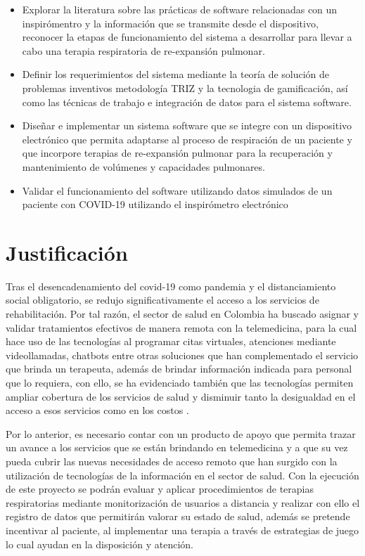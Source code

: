 \begin{itemize}
\item Explorar la literatura sobre las pr\'acticas de software relacionadas con un inspir\'omentro y la informaci\'on que se transmite desde el dispositivo, reconocer la etapas de funcionamiento del sistema a desarrollar para llevar a cabo una terapia respiratoria de  re-expansi\'on pulmonar.

\item Definir los requerimientos del sistema mediante la teor\'ia de soluci\'on de problemas inventivos metodolog\'ia TRIZ y la tecnologia de gamificaci\'on, as\'i como las t\'ecnicas de trabajo e integraci\'on de datos para el sistema software.

\item Dise\~{n}ar e implementar un sistema software que se integre con un dispositivo electr\'onico que permita adaptarse al proceso de respiraci\'on de un paciente y que incorpore terapias de re-expansi\'on pulmonar para la recuperaci\'on y mantenimiento de vol\'umenes y capacidades pulmonares.

\item Validar el funcionamiento del software utilizando datos simulados de un paciente con COVID-19 utilizando el inspir\'ometro electr\'onico 

\end{itemize}


\section{Justificaci\'on}

Tras el desencadenamiento del covid-19 como pandemia y el distanciamiento social obligatorio, se redujo significativamente el acceso a los servicios de rehabilitaci\'on. Por tal raz\'on, el sector de salud en Colombia ha buscado asignar y validar tratamientos efectivos de manera remota con la telemedicina, para la cual hace uso de las tecnolog\'ias al programar citas virtuales, atenciones mediante videollamadas, chatbots entre otras soluciones que han complementado el servicio que brinda un terapeuta, adem\'as de brindar informaci\'on indicada para personal que lo requiera, con ello, se  ha evidenciado tambi\'en que las tecnolog\'ias permiten ampliar cobertura de los servicios de salud y disminuir tanto la desigualdad en el acceso a esos servicios como en los costos \cite{7}.

Por lo anterior, es necesario contar con un producto de apoyo que permita trazar un avance a los servicios que se est\'an brindando en telemedicina y a que su vez pueda cubrir las nuevas necesidades de acceso remoto que han surgido con la utilizaci\'on de tecnolog\'ias de la informaci\'on en el sector de salud. Con la ejecuci\'on de este proyecto se podr\'an evaluar y aplicar procedimientos de terapias respiratorias mediante monitorizaci\'on de usuarios a distancia y realizar con ello el registro de datos que permitir\'an valorar su estado de salud, adem\'as se pretende incentivar al paciente, al  implementar una terapia a trav\'es de estrategias de juego lo cual ayudan en la disposici\'on y atenci\'on. 

